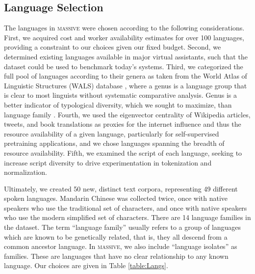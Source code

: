 \documentclass[11pt]{article}
\newcommand{\M}{\textsc{massive}}
\begin{document}
\subsection{Language Selection}

The languages in \M{} were chosen according to the following considerations. First, we acquired cost and worker availability estimates for over 100 languages, providing a constraint to our choices given our fixed budget.
Second, we determined existing languages available in major virtual assistants, such that the dataset could be used to benchmark today's systems.
Third, we categorized the full pool of languages according to their genera as taken from the World Atlas of Linguistic Structures (WALS) database \citep{wals}, where a genus is a language group that is clear to most linguists without systematic comparative analysis.
Genus is a better indicator of typological diversity, which we sought to maximize, than language family \citep{Dryer-1989}.
Fourth, we used the eigenvector centrality of Wikipedia articles, tweets, and book translations \citep{links-that-speak} as proxies for the internet influence and thus the resource availability of a given language, particularly for self-supervised pretraining applications, and we chose languages spanning the breadth of resource availability.
Fifth, we examined the script of each language, seeking to increase script diversity to drive experimentation in tokenization and normalization.

Ultimately, we created 50 new, distinct text corpora, representing 49 different spoken languages.
Mandarin Chinese was collected twice, once with native speakers who use the traditional set of characters, and once with native speakers who use the modern simplified set of characters.
There are 14 language families in the dataset.
The term ``language family'' usually refers to a group of languages which are known to be genetically related, that is, they all descend from a common ancestor language.
In \M{}, we also include ``language isolates'' as families.
These are languages that have no clear relationship to any known language.
Our choices are given in Table \ref{table:Langs}.
\end{document}
